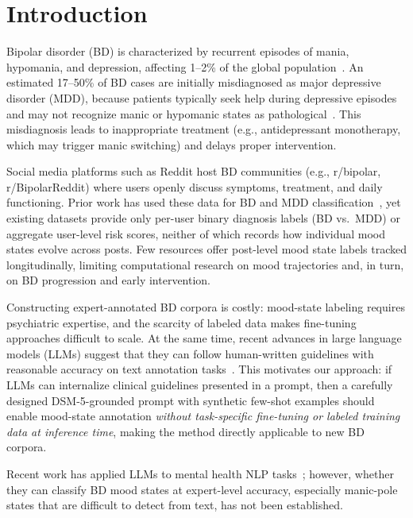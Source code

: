 \documentclass[runningheads]{llncs}
\begin{document}
\section{Introduction}

Bipolar disorder (BD) is characterized by recurrent episodes of mania, hypomania, and depression, affecting 1--2\% of the global population~\cite{grande2016bipolar}. An estimated 17--50\% of BD cases are initially misdiagnosed as major depressive disorder (MDD), because patients typically seek help during depressive episodes and may not recognize manic or hypomanic states as pathological~\cite{hirschfeld2002guideline,vieta2018misdiagnosis}. This misdiagnosis leads to inappropriate treatment (e.g., antidepressant monotherapy, which may trigger manic switching) and delays proper intervention.

Social media platforms such as Reddit host BD communities (e.g., r/bipolar, r/BipolarReddit) where users openly discuss symptoms, treatment, and daily functioning. Prior work has used these data for BD and MDD classification~\cite{cohan2018smhd,coppersmith2015clpsych,sekulic2018not}, yet existing datasets provide only per-user binary diagnosis labels (BD vs.~MDD) or aggregate user-level risk scores, neither of which records how individual mood states evolve across posts. Few resources offer post-level mood state labels tracked longitudinally, limiting computational research on mood trajectories and, in turn, on BD progression and early intervention.

Constructing expert-annotated BD corpora is costly: mood-state labeling requires psychiatric expertise, and the scarcity of labeled data makes fine-tuning approaches difficult to scale. At the same time, recent advances in large language models (LLMs) suggest that they can follow human-written guidelines with reasonable accuracy on text annotation tasks~\cite{gilardi2023chatgpt}. This motivates our approach: if LLMs can internalize clinical guidelines presented in a prompt, then a carefully designed DSM-5-grounded prompt with synthetic few-shot examples should enable mood-state annotation \emph{without task-specific fine-tuning or labeled training data at inference time}, making the method directly applicable to new BD corpora.

Recent work has applied LLMs to mental health NLP tasks~\cite{xu2024mental,yang2024mentallama}; however, whether they can classify BD mood states at expert-level accuracy, especially manic-pole states that are difficult to detect from text, has not been established.
\end{document}

